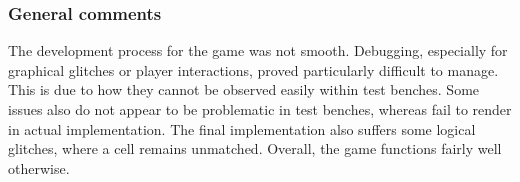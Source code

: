 \subsubsection{General comments}
The development process for the game was not smooth. Debugging, especially for graphical glitches or 
player interactions, proved particularly difficult to manage. 
This is due to how they cannot be observed easily within test benches. Some issues also 
do not appear to be problematic in test benches, whereas fail to render in actual implementation. 
The final implementation also suffers some logical glitches, where a cell remains unmatched. Overall,
the game functions fairly well otherwise. 